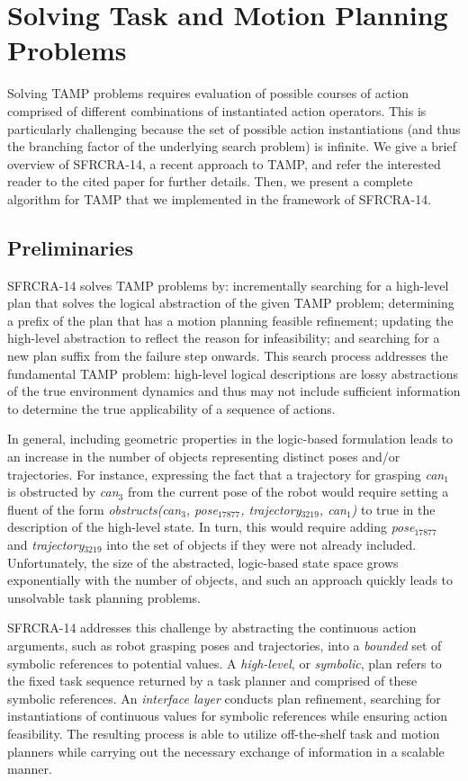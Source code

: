 \section{Solving Task and Motion Planning Problems}
Solving TAMP problems requires evaluation of
possible courses of action comprised of different combinations of
instantiated action operators. This is particularly challenging
because the set of possible action instantiations (and thus the
branching factor of the underlying search problem) is infinite.
We give a brief overview of SFRCRA-14, a recent approach to TAMP, and
refer the interested reader to the cited paper for further details.
Then, we present a complete algorithm for TAMP that we implemented in
the framework of SFRCRA-14.

\subsection{Preliminaries}
SFRCRA-14 solves TAMP problems by: incrementally
searching for a high-level plan that solves the logical abstraction
of the given TAMP problem; determining a prefix of the plan that has a
motion planning feasible refinement; updating the high-level
abstraction to reflect the reason for infeasibility; and searching for
a new plan suffix from the failure step onwards. This search process
addresses the fundamental TAMP problem: high-level
logical descriptions are lossy abstractions of the true environment
dynamics and thus may not include sufficient information to
determine the true applicability of a sequence of actions.

In general, including geometric properties in the logic-based formulation leads to an
increase in the number of objects representing distinct poses and/or trajectories. For
instance, expressing the fact that a trajectory for grasping \emph{can$_1$} is obstructed by
\emph{can$_3$} from the current pose of the robot would require setting a fluent of the
form \emph{obstructs(can$_3$, pose$_{17877}$, trajectory$_{3219}$, can$_1$)} to true in
the description of the high-level state. In turn, this would require adding
\emph{pose$_{17877}$} and \emph{trajectory$_{3219}$} into the set of objects if they were
not already included. Unfortunately, the size of the abstracted, logic-based state space
grows exponentially with the number of objects, and such an approach quickly leads to
unsolvable task planning problems.

SFRCRA-14 addresses this challenge by abstracting the continuous
action arguments, such as robot grasping poses and trajectories, into
a \emph{bounded} set of symbolic references to potential values. A
\emph{high-level}, or \emph{symbolic}, plan refers to the fixed task
sequence returned by a task planner and comprised of these symbolic
references. An \emph{interface layer} conducts plan refinement,
searching for instantiations of continuous values for symbolic
references while ensuring action feasibility.  The resulting process
is able to utilize off-the-shelf task and motion planners while
carrying out the necessary exchange of information in a scalable
manner.

